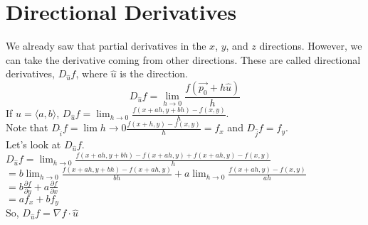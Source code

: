 \section{Directional Derivatives}
\noindent
We already saw that partial derivatives in the $x$, $y$, and $z$ directions. However, we can take the derivative coming from other directions. These are called directional derivatives, $D_{\hat{u}}{f}$, where $\hat{u}$ is the direction.
$$D_{\hat{u}}{f}=\lim_{h\to 0}{\frac{f(\vec{p_0}+h\hat{u})}{h}}$$
\noindent
If $\hat{u}=\langle a,b\rangle$, $D_{\hat{u}}{f}=\lim_{h\to 0}{\frac{f(x+ah,y+bh)-f(x,y)}{h}}$.\\
Note that $D_{\hat{i}}{f}=\lim{h\to 0}{\frac{f(x+h,y)-f(x,y)}{h}}=f_x$ and $D_{\hat{j}}{f}=f_y$.\\
Let's look at $D_{\hat{u}}{f}$.\\
\indent
$D_{\hat{u}}{f}=\lim_{h\to 0}{\frac{f(x+ah,y+bh)-f(x+ah,y)+f(x+ah,y)-f(x,y)}{h}}$\\
\indent
$=b\lim_{h\to 0}{\frac{f(x+ah,y+bh)-f(x+ah,y)}{bh}}+a\lim_{h\to 0}{\frac{f(x+ah,y)-f(x,y)}{ah}}$\\
\indent
$=b\frac{\partial f}{\partial y}+a\frac{\partial f}{\partial x}$\\
\indent
$=af_x+bf_y$\\
\indent
So, $D_{\hat{u}}{f}=\nabla f\cdot\hat{u}$

